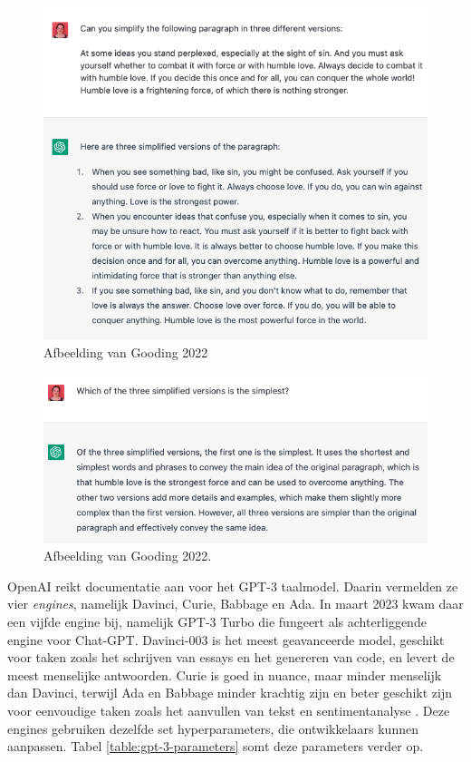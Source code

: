 \begin{figure}[H]
	\includegraphics[width=\linewidth]{img/chatgpt-example-different-versions-gooding.png}
	\caption{Afbeelding van Gooding 2022}
	\label{img:different-versions-gooding}
\end{figure}

\begin{figure}[H]
	\includegraphics[width=\linewidth]{img/chatgpt-example-evaluation-gooding.png}
	\caption{Afbeelding van Gooding 2022.}
	\label{img:evaluation-gooding}
\end{figure}

OpenAI reikt documentatie aan voor het GPT-3 taalmodel. Daarin vermelden ze vier \textit{engines}, namelijk Davinci, Curie, Babbage en Ada. In maart 2023 kwam daar een vijfde engine bij, namelijk GPT-3 Turbo die fungeert als achterliggende engine voor Chat-GPT. Davinci-003 is het meest geavanceerde model, geschikt voor taken zoals het schrijven van essays en het genereren van code, en levert de meest menselijke antwoorden. Curie is goed in nuance, maar minder menselijk dan Davinci, terwijl Ada en Babbage minder krachtig zijn en beter geschikt zijn voor eenvoudige taken zoals het aanvullen van tekst en sentimentanalyse \autocite{Brockman2023}. Deze engines gebruiken dezelfde set hyperparameters, die ontwikkelaars kunnen aanpassen. Tabel \ref{table:gpt-3-parameters} somt deze parameters verder op.

